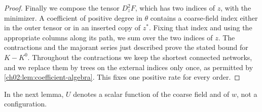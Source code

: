 \begin{proof}
Finally we compose the tensor $D_z^2F$, which has two indices of $z$, with the minimizer. A coefficient of positive degree in $\theta$ contains a coarse-field index either in the outer tensor or in an inserted copy of $z^*$. Fixing that index and using the appropriate columns along its path, we sum over the two indices of $z$. The contractions and the majorant series just described prove the stated bound for $K-K^0$. Throughout the contractions we keep the shortest connected networks, and we replace them by trees on the external indices only once, as permitted by \cref{ch02:lem:coefficient-algebra}. This fixes one positive rate for every order.
\end{proof}

In the next lemma, $U$ denotes a scalar function of the coarse field and of $w$, not a configuration.

